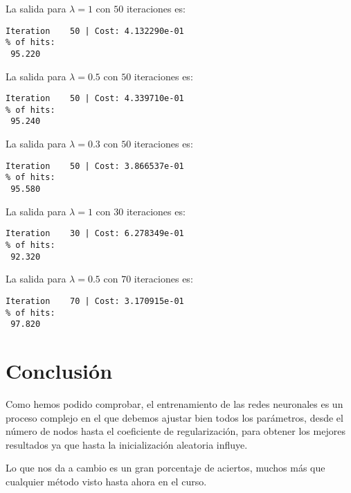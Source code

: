 \documentclass{article}
\begin{document}
La salida para $\lambda = 1$ con $50$ iteraciones es:
\begin{lstlisting}[style=snippet]
Iteration    50 | Cost: 4.132290e-01
% of hits:
 95.220
\end{lstlisting}

La salida para $\lambda = 0.5$ con $50$ iteraciones es:
\begin{lstlisting}[style=snippet]
Iteration    50 | Cost: 4.339710e-01
% of hits:
 95.240
\end{lstlisting}

La salida para $\lambda = 0.3$ con $50$ iteraciones es:
\begin{lstlisting}[style=snippet]
Iteration    50 | Cost: 3.866537e-01
% of hits:
 95.580
\end{lstlisting}

La salida para $\lambda = 1$ con $30$ iteraciones es:
\begin{lstlisting}[style=snippet]
Iteration    30 | Cost: 6.278349e-01
% of hits:
 92.320
\end{lstlisting}

La salida para $\lambda = 0.5$ con $70$ iteraciones es:
\begin{lstlisting}[style=snippet]
Iteration    70 | Cost: 3.170915e-01
% of hits:
 97.820
\end{lstlisting}

\section{Conclusión}
Como hemos podido comprobar, el entrenamiento de las redes neuronales es un proceso complejo en el que debemos ajustar bien todos los parámetros, desde el número de nodos hasta el coeficiente de regularización, para obtener los mejores resultados ya que hasta la inicialización aleatoria influye.

Lo que nos da a cambio es un gran porcentaje de aciertos, muchos más que cualquier método visto hasta ahora en el curso.
\end{document}
